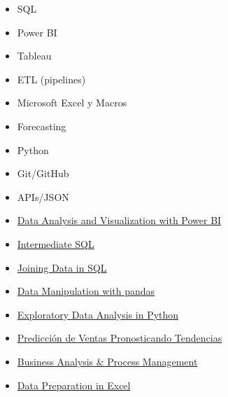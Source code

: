 

\begin{itemize}
\item SQL
\item Power BI 
\item Tableau
\item ETL (pipelines)
\item Microsoft Excel y Macros
\item Forecasting
\item Python
\item Git/GitHub
\item APIs/JSON
\end{itemize} 

\begin{itemize}

\item  \href{https://www.coursera.org/account/accomplishments/verify/ZJ8H32P3MBMD}{Data Analysis and Visualization with Power BI} 

\item  \href{https://www.datacamp.com/completed/statement-of-accomplishment/course/d5fb3ae91bcd6fde0d025066a69cc391a3ef00b1}{Intermediate SQL} 

\item  \href{https://www.datacamp.com/statement-of-accomplishment/course/5fb9f09b075ee75769606b28d34d3c62960fe021?raw=1}{Joining Data in SQL}

\item  \href{https://www.datacamp.com/statement-of-accomplishment/course/6291221425f4ade691e80221f15f92f3b0808d2e?raw=1}{Data Manipulation with pandas}

\item  \href{https://www.datacamp.com/statement-of-accomplishment/course/502b8bdca42635fad7cbab9959b8f56f148ad322?raw=1}{Exploratory Data Analysis in Python}

\item  \href{https://coursera.org/share/f0175b580cd8d19122ee0be74b46cc1c}{Predicción de Ventas Pronosticando Tendencias} 

\item  \href{https://coursera.org/share/9041640e300bb0c5f554e1d0f2f28feb}{Business Analysis \& Process Management} 

\item  \href{https://www.datacamp.com/completed/statement-of-accomplishment/course/5ac1adbe9cb6c20da7d3ab479d65dcea464e4204}{Data Preparation in Excel} 

\end{itemize}

